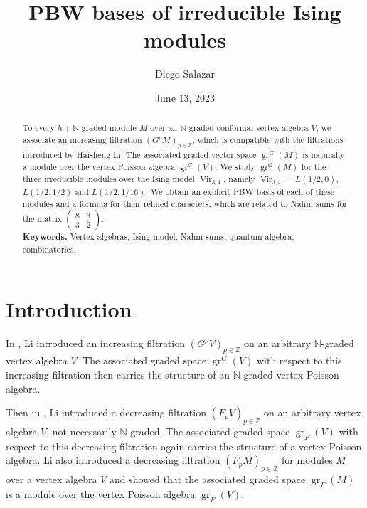 \documentclass[a4paper, 12pt, reqno]{amsart}
\theoremstyle{remark}
\DeclareMathOperator{\Vir}{Vir}
\DeclareMathOperator{\gr}{gr}
\begin{document}
\setcounter{section}{-1}

\begin{abstract}
  To every $h + \mathbb{N}$-graded module $M$ over an $\mathbb{N}$-graded conformal vertex algebra $V$, we associate an increasing filtration $(G^pM)_{p \in \mathbb{Z}}$, which is compatible with the filtrations introduced by Haisheng Li.
  The associated graded vector space $\gr^G(M)$ is naturally a module over the vertex Poisson algebra $\gr^G(V)$.
  We study $\gr^G(M)$ for the three irreducible modules over the Ising model $\Vir_{3, 4}$, namely $\Vir_{3,4} = L(1/2, 0)$, $L(1/2, 1/2)$ and $L(1/2, 1/16)$.
  We obtain an explicit PBW basis of each of these modules and a formula for their refined characters, which are related to Nahm sums for the matrix $\left(\begin{smallmatrix} 8 & 3 \\ 3 & 2 \end{smallmatrix}\right)$. \\
  \smallskip
  \noindent \textbf{Keywords.} Vertex algebras, Ising model, Nahm sums, quantum algebra, combinatorics.
\end{abstract}

\title{PBW bases of irreducible Ising modules}
\author{Diego Salazar}
\address{Instituto de Matemática Pura e Aplicada, Rio de Janeiro, RJ, Brazil}
\date{June 13, 2023}
\maketitle

\section{Introduction}
\label{sec:introduction}

In \cite{li_vertex_2004}, Li introduced an increasing filtration $(G^pV)_{p \in \mathbb{Z}}$ on an arbitrary $\mathbb{N}$-graded vertex algebra $V$.
The associated graded space $\gr^G(V)$ with respect to this increasing filtration then carries the structure of an $\mathbb{N}$-graded vertex Poisson algebra.

Then in \cite{li_abelianizing_2005}, Li introduced a decreasing filtration $(F_pV)_{p \in \mathbb{Z}}$ on an arbitrary vertex algebra $V$, not necessarily $\mathbb{N}$-graded.
The associated graded space $\gr_F(V)$ with respect to this decreasing filtration again carries the structure of a vertex Poisson algebra.
Li also introduced a decreasing filtration $(F_pM)_{p \in \mathbb{Z}}$ for modules $M$ over a vertex algebra $V$ and showed that the associated graded space $\gr_F(M)$ is a module over the vertex Poisson algebra $\gr_F(V)$.
\end{document}
